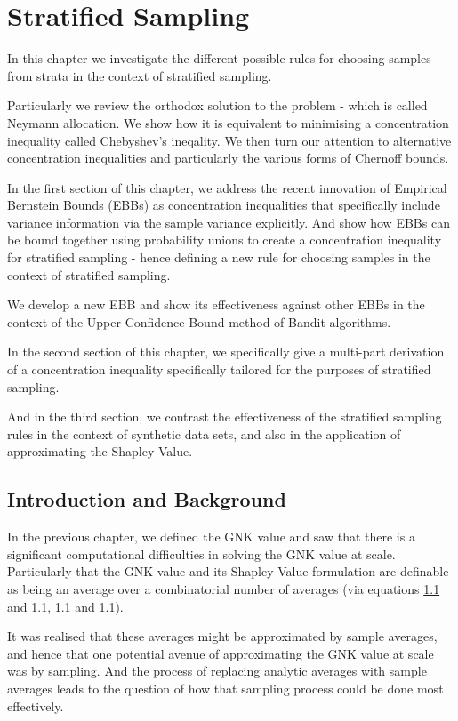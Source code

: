 \chapter{Stratified Sampling}

In this chapter we investigate the different possible rules for choosing samples from strata in the context of stratified sampling.

Particularly we review the orthodox solution to the problem - which is called Neymann allocation.
We show how it is equivalent to minimising a concentration inequality called Chebyshev's ineqality.
We then turn our attention to alternative concentration inequalities and particularly the various forms of Chernoff bounds.

In the first section of this chapter, we address the recent innovation of Empirical Bernstein Bounds (EBBs) as concentration inequalities that specifically include variance information via the sample variance explicitly.
And show how EBBs can be bound together using probability unions to create a concentration inequality for stratified sampling - hence defining a new rule for choosing samples in the context of stratified sampling.

We develop a new EBB and show its effectiveness against other EBBs in the context of the Upper Confidence Bound method of Bandit algorithms.

In the second section of this chapter, we specifically give a multi-part derivation of a concentration inequality specifically tailored for the purposes of stratified sampling.

And in the third section, we contrast the effectiveness of the stratified sampling rules in the context of synthetic data sets, and also in the application of approximating the Shapley Value.

\section{Introduction and Background}

In the previous chapter, we defined the GNK value and saw that there is a significant computational difficulties in solving the GNK value at scale.
Particularly that the GNK value and its Shapley Value formulation are definable as being an average over a combinatorial number of averages (via equations \ref{} and \ref{}, \ref{} and \ref{}).

It was realised that these averages might be approximated by sample averages,
and hence that one potential avenue of approximating the GNK value at scale was by sampling.
And the process of replacing analytic averages with sample averages leads to the question of how that sampling process could be done most effectively.

